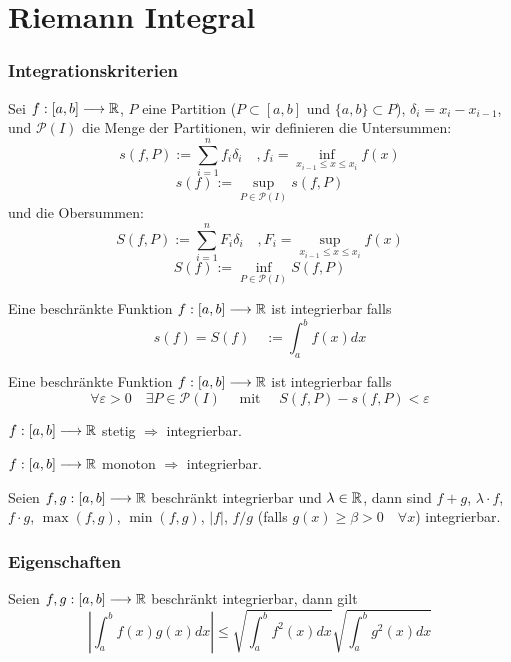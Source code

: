 \part{Riemann Integral}
\setcounter{section}{0}


\section{Integrationskriterien}

\Def Sei $f : [a,b] \longrightarrow \mathbb{R}$, $P$ eine Partition ($P \subset [a,b]$ und $\{a,b\} \subset P$), $\delta_{i} = x_i-x_{i-1}$,
und $\mathcal{P}(I)$ die Menge der Partitionen, wir definieren die Untersummen:
$$s(f, P):=\sum_{i=1}^{n} f_{i} \delta_{i} \quad, f_i = \inf_{x_{i-1}\leq x \leq x_i} f(x)$$
$$s(f):=\sup_{P \in \mathcal{P}(I)} s(f, P)$$
und die Obersummen:
$$S(f, P):=\sum_{i=1}^{n} F_{i} \delta_{i} \quad, F_i = \sup_{x_{i-1}\leq x \leq x_i} f(x)$$
$$S(f):=\inf_{P \in \mathcal{P}(I)} S(f, P)$$

\Def Eine beschränkte Funktion $f : [a,b] \longrightarrow \mathbb{R}$ ist integrierbar falls
$$s(f) = S(f) \quad := \int_{a}^{b} f(x) dx$$

\Satz Eine beschränkte Funktion $f : [a,b] \longrightarrow \mathbb{R}$ ist integrierbar falls
$$\forall \varepsilon>0 \quad \exists P \in \mathcal{P}(I) \quad \text { mit } \quad S(f, P)-s(f, P)<\varepsilon$$

\Satz $f : [a,b] \longrightarrow \mathbb{R}$  stetig $\Rightarrow$ integrierbar.

\Satz $f : [a,b] \longrightarrow \mathbb{R}$  monoton $\Rightarrow$ integrierbar.

\Satz Seien $f,g : [a,b] \longrightarrow \mathbb{R}$ beschränkt integrierbar und $\lambda \in \mathbb{R}$, dann sind $f+g$, $\lambda \cdot f$, $f \cdot g$, 
$\max (f,g)$, $\min (f,g)$, $|f|$,  $f / g$ (falls $g(x) \geq \beta > 0 \quad \forall x$) integrierbar.


\section{Eigenschaften}

 Seien $f,g : [a,b] \longrightarrow \mathbb{R}$ beschränkt integrierbar, dann gilt
$$
\left|\int_{a}^{b} f(x) g(x) d x\right| \leqslant \sqrt{\int_{a}^{b} f^{2}(x) d x} \sqrt{\int_{a}^{b} g^{2}(x) d x}
$$

